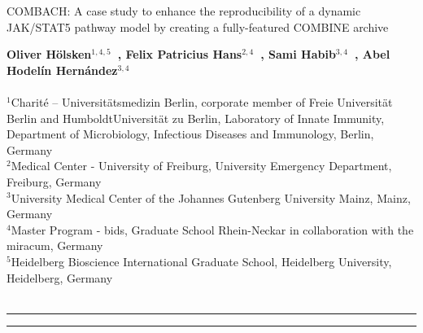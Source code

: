\begin{titlepage}


\begin{centering}
\vspace{1cm}

{\noindent\huge{COMBACH: A case study to enhance the reproducibility of a dynamic JAK/STAT5 pathway model by creating a fully-featured COMBINE archive }}

\end{centering}


\vspace{2cm}
\noindent\textbf{Oliver H\"olsken$^{1,4,5}$~, Felix Patricius Hans$^{2,4}$~, Sami Habib$^{3,4}$~, Abel Hodel\'in Hern\'andez$^{3,4}$~}
\\ \\
	\small $^{1}$Charit\'e – Universit\"atsmedizin Berlin, corporate member of Freie Universit\"at Berlin and HumboldtUniversit\"at zu Berlin, Laboratory of Innate Immunity, Department of Microbiology, Infectious Diseases and Immunology, Berlin, Germany \\
	\small $^{2}$Medical Center - University of Freiburg, University Emergency Department, Freiburg, Germany \\
	\small $^{3}$University Medical Center of the Johannes Gutenberg University Mainz, Mainz, Germany \\
	\small $^{4}$Master Program - \ac{bids}, Graduate School Rhein-Neckar in collaboration with the \ac{miracum}, Germany \\
	\small $^{5}$Heidelberg Bioscience International Graduate School, Heidelberg University, Heidelberg, Germany \\
	\\


\newpage
\hrule



\noindent{}
\hspace{10pt}
\hrule
\end{titlepage}
